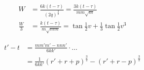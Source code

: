 \documentclass[12pt,a4paper]{article}
\begin{document}
\begin{align*}
W &= \frac{6k(t - \tau)}{(2q)^{\frac{3}{2}}} = \frac{3k(t - \tau)}{mm\sqrt{m}} \\
\frac{W}{3} &= \frac{k(t - \tau)}{m\sqrt{mm}} = \tan\tfrac{1}{2}v + \tfrac{1}{3}\tan\tfrac{1}{2}v^3
\end{align*}

\begin{align*}
t' - t &= \frac{mm'm' - nnn'}{6kk'} \cdot \ldots \\
&= \frac{1}{6kk'}(r' + r + p)^{\frac{3}{2}} - (r' + r - p)^{\frac{3}{2}}
\end{align*}

\newpage
\end{document}
